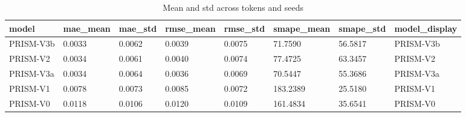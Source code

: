 \begin{table}[htbp]
\centering
\begin{tabular}{llllllll}
\hline
model & mae_mean & mae_std & rmse_mean & rmse_std & smape_mean & smape_std & model_display \\
\hline
PRISM-V3b & 0.0033 & 0.0062 & 0.0039 & 0.0075 & 71.7590 & 56.5817 & PRISM-V3b \\
PRISM-V2 & 0.0034 & 0.0061 & 0.0040 & 0.0074 & 77.4725 & 63.3457 & PRISM-V2 \\
PRISM-V3a & 0.0034 & 0.0064 & 0.0036 & 0.0069 & 70.5447 & 55.3686 & PRISM-V3a \\
PRISM-V1 & 0.0078 & 0.0073 & 0.0085 & 0.0072 & 183.2389 & 25.5180 & PRISM-V1 \\
PRISM-V0 & 0.0118 & 0.0106 & 0.0120 & 0.0109 & 161.4834 & 35.6541 & PRISM-V0 \\
\hline
\end{tabular}
\caption{Mean and std across tokens and seeds}
\label{table_main_forecasting_comparison}
\end{table}